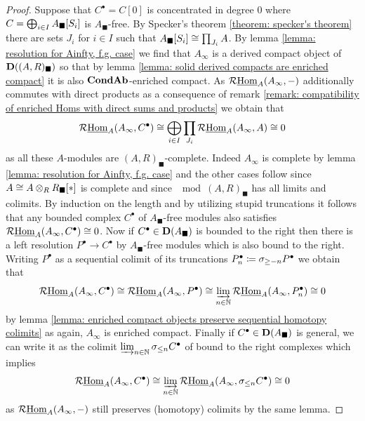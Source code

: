 \begin{proof}
	Suppose that $C^\bullet = C[0]$ is concentrated in degree $0$ where $C = \bigoplus_{i\in I} {A_\blacksquare[S_i]}$ is $A_\blacksquare$-free. By Specker's theorem \ref{theorem: specker's theorem} there are sets $J_i$ for $i\in I$ such that ${A_\blacksquare[S_i]} \cong \prod_{J_i} A$. By lemma \ref{lemma: resolution for Ainfty, f.g. case} we find that $A_\infty$ is a derived compact object of ${{\mathbf{D}}((A, R)_\blacksquare)}$ so that by lemma \ref{lemma: solid derived compacts are enriched compact} it is also ${{{\mathbf{Cond}}}{{\mathbf{Ab}}}}$-enriched compact. As $\mathcal{R}{\underline{\operatorname{Hom}}}_A(A_\infty, -)$ additionally commutes with direct products as a consequence of remark \ref{remark: compatibility of enriched Homs with direct sums and products} we obtain that
		$$\mathcal{R}{\underline{\operatorname{Hom}}}_A(A_\infty, C^\bullet) \cong \bigoplus_{i\in I} \prod_{J_i} \mathcal{R}{\underline{\operatorname{Hom}}}_A(A_\infty, A)\cong 0$$
	as all these $A$-modules are $(A, R)_\blacksquare$-complete. Indeed $A_\infty$ is complete by lemma \ref{lemma: resolution for Ainfty, f.g. case} and the other cases follow since $A \cong A\otimes_R{R_\blacksquare[\ast]}$ is complete and since $\mod{(A, R)_\blacksquare}$ has all limits and colimits. By induction on the length and by utilizing stupid truncations it follows that any bounded complex $C^\bullet$ of $A_\blacksquare$-free modules also satisfies $\mathcal{R}{\underline{\operatorname{Hom}}}_A(A_\infty, C^\bullet) \cong 0$. Now if $C^\bullet\in{{\mathbf{D}}(A_\blacksquare)}$ is bounded to the right then there is a left resolution $P^\bullet \to C^\bullet$ by $A_\blacksquare$-free modules which is also bound to the right. Writing $P^\bullet$ as a sequential colimit of its truncations $P_n^\bullet \coloneqq {\sigma_{\ge -n}} P^\bullet$ we obtain that
		$$\mathcal{R}{\underline{\operatorname{Hom}}}_A(A_\infty, C^\bullet) \cong \mathcal{R}{\underline{\operatorname{Hom}}}_A(A_\infty, P^\bullet) \cong \varinjlim_{n\in {\mathbb{N}}} \mathcal{R}{\underline{\operatorname{Hom}}}_A(A_\infty, P_n^\bullet) \cong 0$$
	by lemma \ref{lemma: enriched compact objects preserve sequential homotopy colimits} as again, $A_\infty$ is enriched compact. Finally if $C^\bullet \in {{\mathbf{D}}(A_\blacksquare)}$ is general, we can write it as the colimit $\varinjlim_{n\in {\mathbb{N}}} {\sigma_{\le n}}C^\bullet$ of bound to the right complexes which implies
	$$\mathcal{R}{\underline{\operatorname{Hom}}}_A(A_\infty, C^\bullet)\cong \varinjlim_{n\in {\mathbb{N}}} \mathcal{R}{\underline{\operatorname{Hom}}}_A(A_\infty, {\sigma_{\le n}} C^\bullet) \cong 0$$
	as $\mathcal{R}{\underline{\operatorname{Hom}}}_A(A_\infty, -)$ still preserves (homotopy) colimits by the same lemma.
	

\end{proof}
